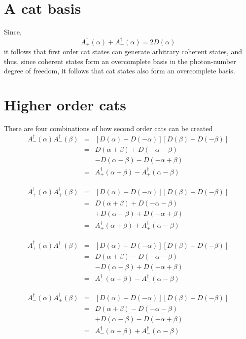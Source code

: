 \documentclass[aps,prl,twocolumn,amsmath,amssymb,nofootinbib,superscriptaddress]{revtex4}
\begin{document}
\section{A cat basis}

Since,
\begin{equation}
A^\dag_+(\alpha) + A^\dag_-(\alpha) = 2D(\alpha)
\end{equation}
it follows that first order cat states can generate arbitrary coherent states, and thus, since coherent states form an overcomplete basis in the photon-number degree of freedom, it follows that cat states also form an overcomplete basis.

\section{Higher order cats}

There are four combinations of how second order cats can be created
\begin{eqnarray} \label{eq:HOC1}
A^\dag_-(\alpha)A^\dag_-(\beta) &=& [D(\alpha)-D(-\alpha)][D(\beta)-D(-\beta)] \nonumber \\ 
&=& D(\alpha+\beta) + D(-\alpha-\beta) \nonumber \\ 
&&- D(\alpha-\beta) - D(-\alpha+\beta) \nonumber \\ 
&=& A^\dag_+(\alpha+\beta) - A^\dag_+(\alpha-\beta)
\end{eqnarray}

\begin{eqnarray} \label{eq:HOC2}
A^\dag_+(\alpha)A^\dag_+(\beta) &=& [D(\alpha)+D(-\alpha)][D(\beta)+D(-\beta)] \nonumber \\ 
&=& D(\alpha+\beta) + D(-\alpha-\beta) \nonumber \\ 
&&+ D(\alpha-\beta) + D(-\alpha+\beta) \nonumber \\ 
&=& A^\dag_+(\alpha+\beta) + A^\dag_+(\alpha-\beta)
\end{eqnarray}

\begin{eqnarray} \label{eq:HOC3}
A^\dag_+(\alpha)A^\dag_-(\beta) &=& [D(\alpha)+D(-\alpha)][D(\beta)-D(-\beta)] \nonumber \\ 
&=& D(\alpha+\beta) - D(-\alpha-\beta) \nonumber \\ 
&& -D(\alpha-\beta) + D(-\alpha+\beta) \nonumber \\ 
&=& A^\dag_-(\alpha+\beta) - A^\dag_-(\alpha-\beta)
\end{eqnarray}

\begin{eqnarray} \label{eq:HOC4}
A^\dag_-(\alpha)A^\dag_+(\beta) &=& [D(\alpha)-D(-\alpha)][D(\beta)+D(-\beta)] \nonumber \\ 
&=& D(\alpha+\beta) - D(-\alpha-\beta) \nonumber \\ 
&& +D(\alpha-\beta) - D(-\alpha+\beta) \nonumber \\ 
&=& A^\dag_-(\alpha+\beta) + A^\dag_-(\alpha-\beta)
\end{eqnarray}
\end{document}
